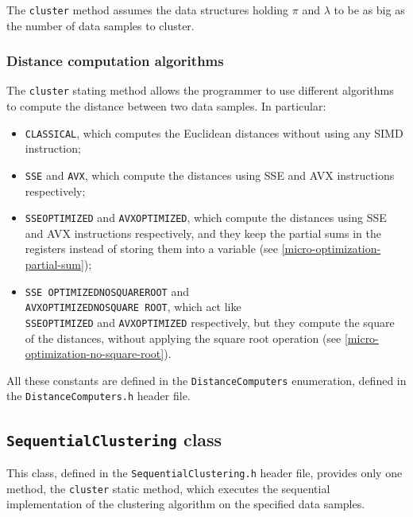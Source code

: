 \documentclass{article}
\begin{document}
The \texttt{cluster} method assumes the data structures holding $\pi$ and
$\lambda$ to be as big as the number of data samples to cluster.

\hypertarget{distance-computation-algorithms}{
\subsubsection{Distance computation algorithms}
\label{distance-computation-algorithms}}

The \texttt{cluster} stating method allows the programmer to use different algorithms to compute
the distance between two data samples. In particular:
\begin{itemize}
\item \texttt{CLASSICAL}, which computes the Euclidean distances without using any SIMD
instruction;
\item \texttt{SSE} and \texttt{AVX}, which compute the distances using SSE and AVX
instructions respectively;
\item \texttt{SSE\textunderscore OPTIMIZED} and \texttt{AVX\textunderscore OPTIMIZED}, which
compute the distances using
SSE and AVX instructions respectively, and they keep the partial sums in the registers
instead of storing them into a variable (see
\ref{micro-optimization-partial-sum});
\item \texttt{SSE\textunderscore
OPTIMIZED\textunderscore NO\textunderscore SQUARE\textunderscore ROOT} and\\
\texttt{AVX\textunderscore OPTIMIZED\textunderscore NO\textunderscore SQUARE\textunderscore
ROOT}, which act like\\ \texttt{SSE\textunderscore OPTIMIZED} and
\texttt{AVX\textunderscore OPTIMIZED} respectively, but they compute the square of the distances,
without applying the square root operation (see \ref{micro-optimization-no-square-root}).
\end{itemize}

All these constants are defined in the \texttt{DistanceComputers} enumeration, defined in the
\texttt{DistanceComputers.h} header file.

\hypertarget{sequential-clustering}{
\subsection{\texttt{SequentialClustering} class}
\label{sequential-clustering}}

This class, defined in the \texttt{SequentialClustering.h} header file, provides only one method,
the \texttt{cluster} static method, which executes the sequential implementation of the
clustering algorithm on the specified data samples.
\end{document}
